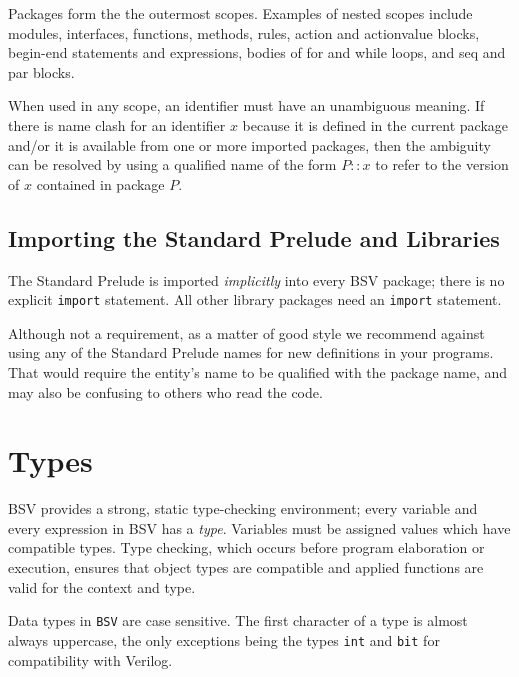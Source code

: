 \documentclass[twoside,letterpaper]{article}
\newcommand{\BSV}{BSV}
\newcommand{\te}[1]{\texttt{#1}}
\begin{document}
Packages form the the outermost scopes.  Examples of nested scopes
include modules, interfaces, functions, methods, rules, action and
actionvalue blocks, begin-end statements and expressions, bodies of
for and while loops, and seq and par blocks.

When used in any scope, an identifier must have an unambiguous
meaning.  If there is name clash for an identifier $x$ because it is
defined in the current package and/or it is available from one or more
imported packages, then the ambiguity can be resolved by using a
qualified name of the form $P::x$ to refer to the version of $x$
contained in package $P$.


\subsection{Importing the Standard Prelude and Libraries}


The Standard Prelude is imported \emph{implicitly} into every {\BSV}
package; there is no explicit \texttt{import} statement.  All other
library packages need an \te{import} statement.

Although not a requirement, as a matter of good style we recommend
against using any of the Standard Prelude names for new definitions in
your programs.  That would require the entity's name to be qualified
with the package name, and may also be confusing to others who read
the code.



\section{Types}

\label{sec-type}


{\BSV} provides a strong, static type-checking environment; every
variable and every expression in {\BSV} has a {\emph{type}}.
Variables must be assigned values which have compatible types.  Type
checking, which occurs before program elaboration or execution,
ensures that object types are compatible and applied functions are
valid for the context and type.

Data types in \te{\BSV} are case sensitive.  The first character of a
type is almost always uppercase, the only exceptions being the types
\te{int} and \te{bit} for compatibility with Verilog. 
\end{document}
